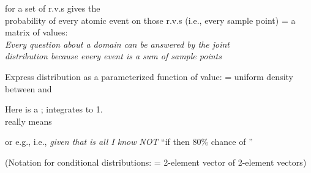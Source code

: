 \documentclass{article}
\begin{document}
\begin{huge}
 for a set of r.v.s gives the\\
probability of every atomic event on those r.v.s (i.e., every sample point)\al
   = a  matrix of values:\\
\emph{Every question about a domain can be answered by the joint\\
distribution because every event is a sum of sample points}


Express distribution as a parameterized function of value:\al
{} = uniform density between  and 

\vspace*{0.2in}

\textwidth
{}

Here  is a ; integrates to 1.\\
 really means
\mat{\[
  \lim_{dx \to 0} P(20.5 \leq X \leq 20.5+dx)/dx = 0.125
\]}



\vspace*{0.2in}

\textwidth
{}


 or \al
  e.g., \al
  i.e., \emph{given that}  \emph{is all I know}\al
  \emph{NOT} ``if  then 80\% chance of ''

(Notation for conditional distributions:\al
   = 2-element vector of 2-element vectors)


\end{huge}
\end{document}
